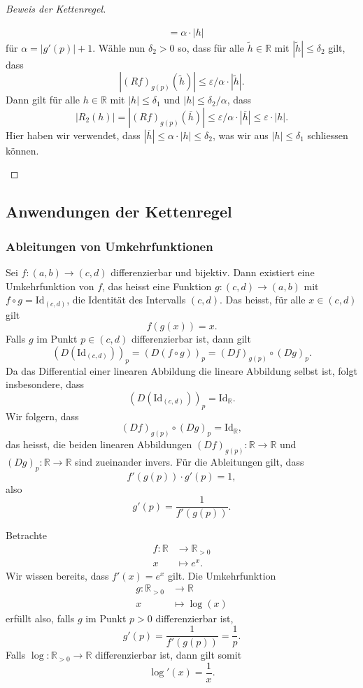 \documentclass[../main.tex]{subfiles}
\begin{document}
\begin{proof}[Beweis der Kettenregel]
\begin{enumerate}[(1)]
\begin{align*}
         &= \alpha \cdot |h|
      \end{align*}
      für $\alpha = |g'(p)| + 1$.
      Wähle nun $\delta_2 > 0$ so,
      dass für alle $\widetilde h \in \mathbb{R}$ 
      mit $|\widetilde h| \leq \delta_2$ gilt,
      dass
      \[
        |{(Rf)}_{g(p)}(\widetilde h)| \leq \varepsilon/\alpha
        \cdot |\widetilde h|.
      \]
      Dann gilt für alle $h \in \mathbb{R}$ mit
      $|h| \leq \delta_1$ und $|h| \leq \delta_2/\alpha$,
      dass
      \[
        |R_2(h)| = |{(Rf)}_{g(p)}(\overline h)|
        \leq \varepsilon/\alpha \cdot |\overline h| \leq
        \varepsilon \cdot |h|.
      \]
      Hier haben wir verwendet, dass
      $|\overline h| \leq \alpha \cdot |h| \leq \delta_2$,
      was wir aus $|h| \leq \delta_1$ schliessen
      können. \qedhere
  \end{enumerate}
\end{proof}

\subsection*{Anwendungen der Kettenregel}
\subsubsection*{Ableitungen von Umkehrfunktionen}
Sei $f \colon (a, b) \to (c, d)$ 
differenzierbar und bijektiv.
Dann existiert eine Umkehrfunktion
von $f$, das heisst eine Funktion
$g \colon (c, d) \to (a, b)$ 
mit $f \circ g = \text{Id}_{(c, d)}$,
die Identität des Intervalls
$(c, d)$. Das heisst, für alle
$x \in (c, d)$ gilt
\[
  f(g(x)) = x.
\]
Falls $g$ im Punkt $p \in (c, d)$
differenzierbar ist, dann gilt
\[
  {(D(\text{Id}_{(c, d)}))}_{p} = 
  {(D(f \circ g))}_p
  = {(Df)}_{g(p)} \circ {(Dg)}_p.
\]
Da das Differential einer linearen Abbildung
die lineare Abbildung selbst ist,
folgt insbesondere, dass
\[
  {(D(\text{Id}_{(c, d)}))}_p = \text{Id}_{\mathbb{R}}.
\]
Wir folgern, dass
\[
  {(Df)}_{g(p)} \circ {(Dg)}_p = \text{Id}_{\mathbb{R}},
\]
das heisst, die beiden linearen Abbildungen
${(Df)}_{g(p)} \colon \mathbb{R} \to \mathbb{R}$
und ${(Dg)}_p \colon \mathbb{R} \to \mathbb{R}$ 
sind zueinander invers.
Für die Ableitungen gilt, dass
\[
  f'(g(p)) \cdot g'(p) = 1,
\]
also
\[
  g'(p) = \frac{1}{f'(g(p))}.
\]

\begin{example}
Betrachte
\begin{align*}
  f \colon \mathbb{R} & \to \mathbb{R}_{>0} \\
  x & \mapsto e^x.
\end{align*}
Wir wissen bereits, dass $f'(x) = e^x$ gilt.
Die Umkehrfunktion
\begin{align*}
  g \colon \mathbb{R}_{>0} & \to \mathbb{R} \\
  x & \mapsto \log(x)
\end{align*}
erfüllt also, falls $g$ im Punkt $p > 0$ differenzierbar ist,
\[
  g'(p) = \frac{1}{f'(g(p))} = \frac{1}{p}.
\]
Falls $\log \colon \mathbb{R}_{>0} \to \mathbb{R}$ 
differenzierbar ist, dann gilt somit
\[
  \log'(x) = \frac{1}{x}.
\]
\end{example}
      
\end{document}
